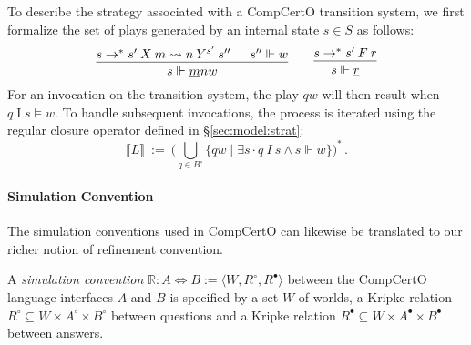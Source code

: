 \documentclass[acmsmall,screen,review,anonymous,nonacm]{acmart}
\newcommand{\que}{\circ}
\newcommand{\ans}{\bullet}
\begin{document}
To describe the strategy associated with a CompCertO transition system,
we first formalize the set of plays generated by an internal state $s \in S$ as follows:
\[
  \begin{prooftree}
    \hypo{s \rightarrow^* s' \: X \: m \leadsto n \: Y^{s'} \: s''}
    \hypo{s'' \Vdash w}
    \infer2{s \Vdash \underline{m}nw}
  \end{prooftree}
  \qquad
  \begin{prooftree}
    \hypo{s \rightarrow^* s' \: F \: r}
    \infer1{s \Vdash \underline{r}}
  \end{prooftree}
\]
For an invocation on the transition system,
the play $qw$ will then result when $q \mathrel{I} s \vDash w$.
To handle subsequent invocations,
the process is iterated using the regular closure operator
defined in \S\ref{sec:model:strat}:
\[
  \llbracket L \rrbracket \: := \:
  \Big(\bigcup_{q \in B^\que} \{ qw \mid \exists s \cdot q \: I \: s \wedge s \Vdash w \} \Big)^*
  \,.
\]

\paragraph{Simulation Convention}

The simulation conventions used in CompCertO
can likewise be translated to our richer notion of
refinement convention.


\begin{definition} \label{def:sconv} %
A \emph{simulation convention}
$\mathbb{R} : A \Leftrightarrow B := \langle W, R^\que, R^\ans \rangle$
between the CompCertO language interfaces $A$ and $B$ is specified by
a set $W$ of worlds,
a Kripke relation $R^\que \subseteq W \times A^\que \times B^\que$
between questions
and
a Kripke relation $R^\ans \subseteq W \times A^\ans \times B^\ans$
between answers.
\end{definition}
\end{document}
